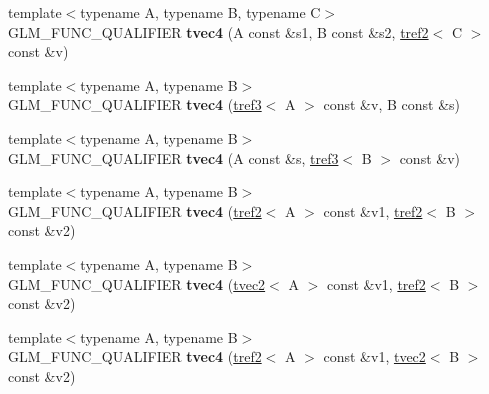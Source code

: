 \begin{DoxyCompactItemize}
\item 
\hypertarget{structglm_1_1detail_1_1tvec4_a5cb8465f83dc0c2001ebfce68b48d67d}{}{\footnotesize template$<$typename A, typename B, typename C$>$ }\\G\+L\+M\+\_\+\+F\+U\+N\+C\+\_\+\+Q\+U\+A\+L\+I\+F\+I\+E\+R {\bfseries tvec4} (A const \&s1, B const \&s2, \hyperlink{structglm_1_1detail_1_1tref2}{tref2}$<$ C $>$ const \&v)\label{structglm_1_1detail_1_1tvec4_a5cb8465f83dc0c2001ebfce68b48d67d}

\item 
\hypertarget{structglm_1_1detail_1_1tvec4_a9507aaa213a90d45ee326f5e4399714a}{}{\footnotesize template$<$typename A, typename B$>$ }\\G\+L\+M\+\_\+\+F\+U\+N\+C\+\_\+\+Q\+U\+A\+L\+I\+F\+I\+E\+R {\bfseries tvec4} (\hyperlink{structglm_1_1detail_1_1tref3}{tref3}$<$ A $>$ const \&v, B const \&s)\label{structglm_1_1detail_1_1tvec4_a9507aaa213a90d45ee326f5e4399714a}

\item 
\hypertarget{structglm_1_1detail_1_1tvec4_a39f14b264146c5861c046e83d778fe9c}{}{\footnotesize template$<$typename A, typename B$>$ }\\G\+L\+M\+\_\+\+F\+U\+N\+C\+\_\+\+Q\+U\+A\+L\+I\+F\+I\+E\+R {\bfseries tvec4} (A const \&s, \hyperlink{structglm_1_1detail_1_1tref3}{tref3}$<$ B $>$ const \&v)\label{structglm_1_1detail_1_1tvec4_a39f14b264146c5861c046e83d778fe9c}

\item 
\hypertarget{structglm_1_1detail_1_1tvec4_a9678b14b8b5b252523fea2d1c867a77b}{}{\footnotesize template$<$typename A, typename B$>$ }\\G\+L\+M\+\_\+\+F\+U\+N\+C\+\_\+\+Q\+U\+A\+L\+I\+F\+I\+E\+R {\bfseries tvec4} (\hyperlink{structglm_1_1detail_1_1tref2}{tref2}$<$ A $>$ const \&v1, \hyperlink{structglm_1_1detail_1_1tref2}{tref2}$<$ B $>$ const \&v2)\label{structglm_1_1detail_1_1tvec4_a9678b14b8b5b252523fea2d1c867a77b}

\item 
\hypertarget{structglm_1_1detail_1_1tvec4_a2cc5a3ca86e95f455ad3623a1bffa0b7}{}{\footnotesize template$<$typename A, typename B$>$ }\\G\+L\+M\+\_\+\+F\+U\+N\+C\+\_\+\+Q\+U\+A\+L\+I\+F\+I\+E\+R {\bfseries tvec4} (\hyperlink{structglm_1_1detail_1_1tvec2}{tvec2}$<$ A $>$ const \&v1, \hyperlink{structglm_1_1detail_1_1tref2}{tref2}$<$ B $>$ const \&v2)\label{structglm_1_1detail_1_1tvec4_a2cc5a3ca86e95f455ad3623a1bffa0b7}

\item 
\hypertarget{structglm_1_1detail_1_1tvec4_a48729e994bdd129af274bc5e53cdac7e}{}{\footnotesize template$<$typename A, typename B$>$ }\\G\+L\+M\+\_\+\+F\+U\+N\+C\+\_\+\+Q\+U\+A\+L\+I\+F\+I\+E\+R {\bfseries tvec4} (\hyperlink{structglm_1_1detail_1_1tref2}{tref2}$<$ A $>$ const \&v1, \hyperlink{structglm_1_1detail_1_1tvec2}{tvec2}$<$ B $>$ const \&v2)\label{structglm_1_1detail_1_1tvec4_a48729e994bdd129af274bc5e53cdac7e}


\end{DoxyCompactItemize}
